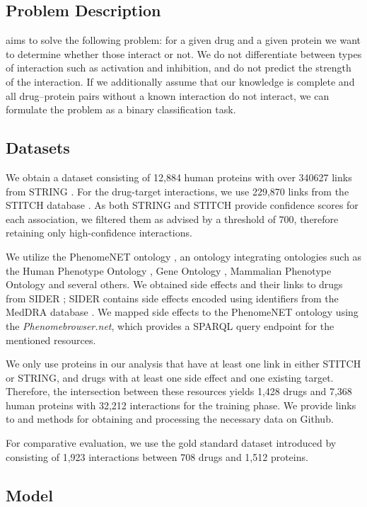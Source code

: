\documentclass{bioinfo}
\renewcommand{\cite}{\citep}
\begin{document}
\subsection{Problem Description}
\name aims to solve the following problem: for a given drug and a
given protein we want to determine whether those interact or not.  We
do not differentiate between types of interaction such as activation
and inhibition, and do not predict the strength of the interaction.
If we additionally assume that our knowledge is complete and all
drug--protein pairs without a known interaction do not interact, we
can formulate the problem as a binary classification task.

\subsection{Datasets}
We obtain a dataset consisting of 12,884 human proteins with over
340627 links from STRING \citep{STRINGv10}. For the drug-target
interactions, we use 229,870 links from the STITCH database
\citep{STITCHv5}. As both STRING and STITCH provide confidence scores
for each association, we filtered them as advised by a threshold of
$700$, therefore retaining only high-confidence interactions.

We utilize the PhenomeNET ontology \citep{PhenomeNET2011}, an ontology
integrating ontologies such as the Human Phenotype Ontology
\citep{HPO2018}, Gene Ontology \cite{GOoriginal2000, GOrecent2020},
Mammalian Phenotype Ontology \citep{MP2009} and several others.
We obtained side effects and their links to drugs from SIDER
\citep{SIDER}; SIDER contains side effects encoded using identifiers
from the MedDRA database \citep{MedDRA}. We mapped side effects to the
PhenomeNET ontology using the \textit{Phenomebrowser.net}, which
provides a SPARQL query endpoint for the mentioned resources.

We only use proteins in our analysis that have at least one link in
either STITCH or STRING, and drugs with at least one side effect and
one existing target. Therefore, the intersection between these
resources yields 1,428 drugs and 7,368 human proteins with 32,212
interactions for the training phase. We provide links to and methods
for obtaining and processing the necessary data on Github.

For comparative evaluation, we use the gold standard dataset
introduced by \citet{Yaminishi2008} consisting of 1,923 interactions
between 708 drugs and 1,512 proteins.
 
\subsection{Model}
\end{document}
